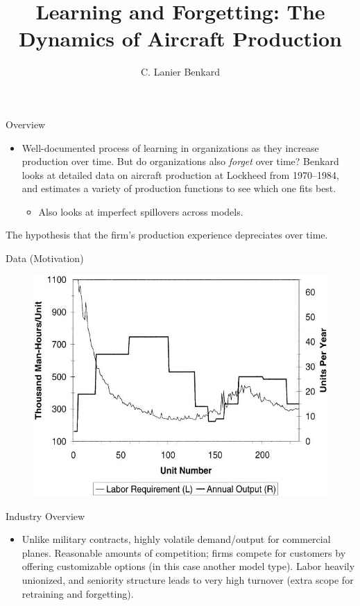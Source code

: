 \documentclass[dvipsnames]{beamer}
\title{Learning and Forgetting: The Dynamics of Aircraft Production}
\author{C. Lanier Benkard}
\begin{document}
\maketitle
\begin{frame}{Overview}
  \begin{itemize}
  \item Well-documented process of learning in organizations as they increase production over time.
    \vitem But do organizations also \emph{forget} over time?
    \vitem Benkard looks at detailed data on aircraft production at Lockheed from 1970--1984, and estimates a variety of production functions to see which one fits best.
    \begin{itemize}
    \item Also looks at imperfect spillovers across models.
    \end{itemize}
  \end{itemize}
  \begin{definition}
   The hypothesis that the firm's production experience depreciates over time. 
  \end{definition}
\end{frame}
%
\begin{frame}{Data (Motivation)}
  \begin{figure}[htp]
    \centering
    \includegraphics[width=\textwidth, keepaspectratio=true]{fig1.jpg}
  \end{figure}
\end{frame}
%
\begin{frame}{Industry Overview}
  \begin{itemize}
  \item Unlike military contracts, highly volatile demand/output for commercial planes.
    \vitem Reasonable amounts of competition; firms compete for customers by offering customizable options (in this case another model type). 
    \vitem Labor heavily unionized, and seniority structure leads to very high turnover (extra scope for retraining and forgetting).
  \end{itemize}
\end{frame}
\end{document}
